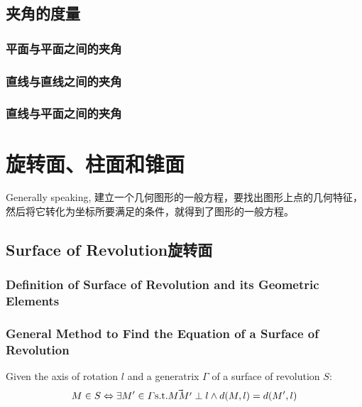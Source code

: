 \documentclass[onecolumn]{ctexart}
\begin{document}
\subsection{夹角的度量}

\subsubsection{平面与平面之间的夹角}

\subsubsection{直线与直线之间的夹角}

\subsubsection{直线与平面之间的夹角}

\section{旋转面、柱面和锥面}

Generally speaking, 建立一个几何图形的一般方程，要找出图形上点的几何特征，然后将它转化为坐标所要满足的条件，就得到了图形的一般方程。

\subsection{Surface of Revolution旋转面}

\subsubsection{Definition of Surface of Revolution and its Geometric Elements}

\subsubsection{General Method to Find the Equation of a Surface of Revolution}

Given the axis of rotation $l$ and a generatrix $\varGamma$ of a surface of revolution $S$:
\begin{equation}
  M \in S \Leftrightarrow \exists M' \in \varGamma \textnormal{s.t.} \vec{MM'} \perp l \wedge d(M, l) = d(M', l)
\end{equation}
\end{document}
